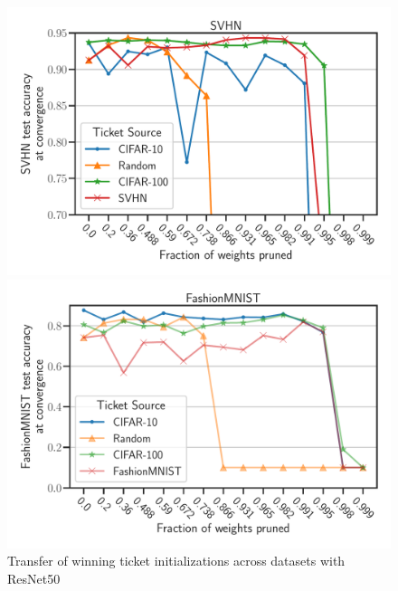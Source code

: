 \begin{figure}[h]
\begin{minipage}{.497\textwidth}
        \end{minipage}
        \begin{minipage}{.497\textwidth}
        \includegraphics[width=\textwidth]{../openreview/plots/Exp2_ResNet_SVHN_N.pdf}
        \end{minipage}
        \begin{minipage}{.497\textwidth}
        \includegraphics[width=\textwidth]{../openreview/plots/Exp2_Resnet_FashionMNIST1_N.pdf}
        \end{minipage}
        \caption{Transfer of winning ticket initializations across datasets with ResNet50}
        \label{fig:exp2_resnet}
    \end{figure}
